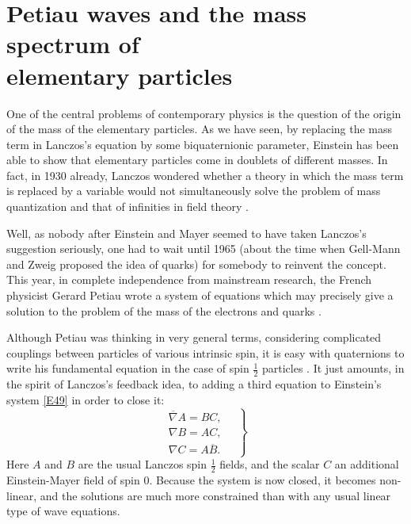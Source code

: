 \documentclass [12pt,a4paper      ]{article}
\newcommand{\CON}{\overline}          %
\begin{document}
\section{Petiau waves and the mass spectrum of\\ elementary particles}
\label{pet:0}

     One  of the central problems of contemporary physics is  the 
question  of the origin of the mass of the elementary  particles.  
As we have seen,  by replacing the mass term in Lanczos's equation 
by some biquaternionic parameter,  Einstein has been able to show 
that  elementary particles come in doublets of different  masses.  
In  fact,  in 1930 already,  Lanczos wondered whether a theory in 
which the mass term is replaced by a variable would not simultaneously solve  
the problem of mass quantization  and that of infinities in field theory
\cite{R38}.

     Well, as nobody after Einstein and Mayer seemed to have taken 
Lanczos's suggestion seriously, 
one had to wait until 1965 (about the time when Gell-Mann  
and Zweig proposed the idea of quarks)  for somebody  to 
reinvent the concept.   This year,  in complete independence from 
mainstream research,  the French physicist Gerard Petiau  wrote a 
system  of  equations which may precisely give a solution to  the 
problem of the mass of the electrons and quarks \cite{R39}.

     Although   Petiau  was  thinking  in  very  general   terms, 
considering  complicated couplings between particles  of  various 
intrinsic  spin,  it  is  easy  with  quaternions  to  write  his 
fundamental equation in the case of spin $\tfrac{1}{2}$ particles \cite{R35}.   It 
just amounts,  in the spirit of Lanczos's feedback idea, to adding 
a third equation to Einstein's system \eqref{E49} in order to close it:
%
\begin{equation}\label{E51}
\left.
\begin{array}{c}
\CON{\nabla} A = B C, \\
\nabla  B = A C, \\
\nabla  C = A \CON{B}.
\end{array}
\quad \right\}
\end{equation}
%
Here $A$ and $B$ are the usual Lanczos spin $\tfrac{1}{2}$  fields,  and  the 
scalar $C$ an additional Einstein-Mayer field of spin  0.   Because 
the system is now closed, it becomes non-linear, and the 
solutions  are  much more constrained than with any usual  linear 
type of wave equations.
\end{document}
